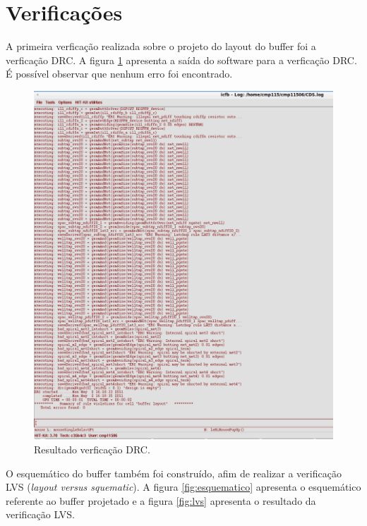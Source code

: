 \documentclass[a4paper,10pt] {article}
\begin{document}
\section{Verificações}
\label{sec:veri}
A primeira verficação realizada sobre o projeto do layout do buffer foi a verficação DRC. A figura \ref{fig:drc} apresenta a saída do software para a verficação DRC. É possível observar que nenhum erro foi encontrado.

\begin{figure} [h]
	\label{fig:drc}
	\centering
	\includegraphics[scale=0.15]{DRC_buffer.png}
	\caption{Resultado verficação DRC.}
\end{figure}

O esquemático do buffer também foi construído, afim de realizar a verificação LVS (\textit{layout versus squematic}). A figura \ref{fig:esquematico} apresenta o esquemático referente ao buffer projetado e a figura \ref{fig:lvs} apresenta o resultado da verificação LVS.
\end{document}
